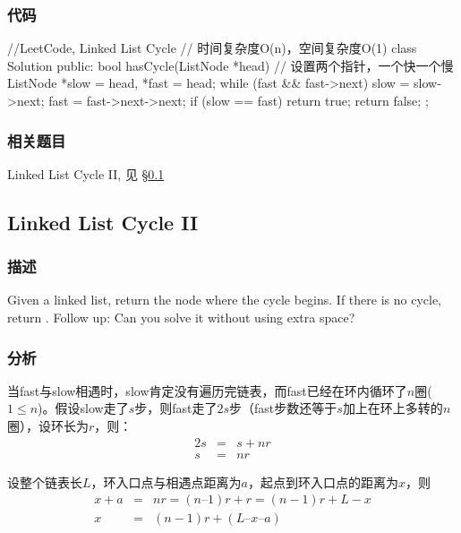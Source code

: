 \subsubsection{代码}
\begin{Code}
	//LeetCode, Linked List Cycle
	// 时间复杂度O(n)，空间复杂度O(1)
	class Solution {
		public:
		bool hasCycle(ListNode *head) {
			// 设置两个指针，一个快一个慢
			ListNode *slow = head, *fast = head;
			while (fast && fast->next) {
				slow = slow->next;
				fast = fast->next->next;
				if (slow == fast) return true;
			}
			return false;
		}
	};
\end{Code}


\subsubsection{相关题目}
\begindot
\item Linked List Cycle II, 见 \S \ref{sec:Linked-List-Cycle-II}
\myenddot


\subsection{Linked List Cycle II}
\label{sec:Linked-List-Cycle-II}

\subsubsection{描述}
Given a linked list, return the node where the cycle begins. If there is no 
cycle, return .
Follow up:
Can you solve it without using extra space?

\subsubsection{分析}
当fast与slow相遇时，slow肯定没有遍历完链表，而fast已经在环内循环了$n$圈($1 \leq 
n$)。假设slow走了$s$步，则fast走了$2s$步（fast步数还等于$s$加上在环上多转的$n$圈），设环长为$r$，则：
\begin{eqnarray}
	2s &=& s + nr \nonumber \\
	s &=& nr \nonumber
\end{eqnarray}

设整个链表长$L$，环入口点与相遇点距离为$a$，起点到环入口点的距离为$x$，则
\begin{eqnarray}
	x + a &=& nr = (n – 1)r +r = (n-1)r + L - x \nonumber \\
	x &=& (n-1)r + (L – x – a) \nonumber
\end{eqnarray}

